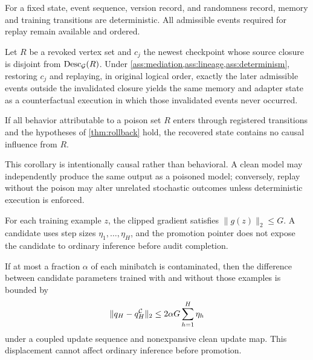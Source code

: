 \begin{assumption}
\label{ass:determinism}
For a fixed state, event sequence, version record, and randomness record, memory and training transitions are deterministic. All admissible events required for replay remain available and ordered.
\end{assumption}

\begin{theorem}
\label{thm:rollback}
Let $R$ be a revoked vertex set and $c_j$ the newest checkpoint whose source closure is disjoint from $\operatorname{Desc}_{\mathcal{G}}(R)$. Under \cref{ass:mediation,ass:lineage,ass:determinism}, restoring $c_j$ and replaying, in original logical order, exactly the later admissible events outside the invalidated closure yields the same memory and adapter state as a counterfactual execution in which those invalidated events never occurred.
\end{theorem}

\begin{corollary}
\label{cor:removal}
If all behavior attributable to a poison set $R$ enters through registered transitions and the hypotheses of \cref{thm:rollback} hold, the recovered state contains no causal influence from $R$.
\end{corollary}

This corollary is intentionally causal rather than behavioral. A clean model may independently produce the same output as a poisoned model; conversely, replay without the poison may alter unrelated stochastic outcomes unless deterministic execution is enforced.

\begin{assumption}
\label{ass:bounded}
For each training example $z$, the clipped gradient satisfies $\|g(z)\|_2\le G$. A candidate uses step sizes $\eta_1,\ldots,\eta_H$, and the promotion pointer does not expose the candidate to ordinary inference before audit completion.
\end{assumption}

\begin{proposition}
\label{prop:influence}
If at most a fraction $\alpha$ of each minibatch is contaminated, then the difference between candidate parameters trained with and without those examples is bounded by
\begin{equation}
\|q_H-q_H^{\mathcal{C}}\|_2\le 2\alpha G\sum_{h=1}^{H}\eta_h
\label{eq:influence-bound}
\end{equation}
under a coupled update sequence and nonexpansive clean update map. This displacement cannot affect ordinary inference before promotion.
\end{proposition}

